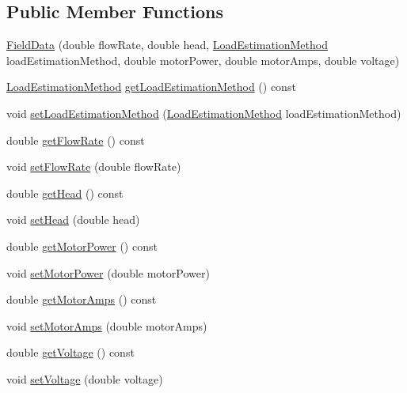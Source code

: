 \subsection*{Public Member Functions}
\begin{DoxyCompactItemize}
\item 
\hyperlink{class_field_data_a33158a88d05e657bd2c8007bae875454}{Field\+Data} (double flow\+Rate, double head, \hyperlink{class_field_data_a424e89914ba5684c01bb269dbe3312fd}{Load\+Estimation\+Method} load\+Estimation\+Method, double motor\+Power, double motor\+Amps, double voltage)
\item 
\hyperlink{class_field_data_a424e89914ba5684c01bb269dbe3312fd}{Load\+Estimation\+Method} \hyperlink{class_field_data_ae213fa76dd005d7fd251ef26beecd311}{get\+Load\+Estimation\+Method} () const
\item 
void \hyperlink{class_field_data_a7d1103b1832956d96146cbe26fb34a6d}{set\+Load\+Estimation\+Method} (\hyperlink{class_field_data_a424e89914ba5684c01bb269dbe3312fd}{Load\+Estimation\+Method} load\+Estimation\+Method)
\item 
double \hyperlink{class_field_data_a59b3261a5162b002d7b73a2d35561bd0}{get\+Flow\+Rate} () const
\item 
void \hyperlink{class_field_data_ad25c3e5a76b4e493e82d3f70cc3c0ed9}{set\+Flow\+Rate} (double flow\+Rate)
\item 
double \hyperlink{class_field_data_ac3e8e0b2de226c858b6c92cdb454bd0d}{get\+Head} () const
\item 
void \hyperlink{class_field_data_ac72a4f958930000bab0e2b772ee26711}{set\+Head} (double head)
\item 
double \hyperlink{class_field_data_a3e8e1bf84bbd00b9b52b803147968c81}{get\+Motor\+Power} () const
\item 
void \hyperlink{class_field_data_a078e6b4899e7046008ccc9de59bd0272}{set\+Motor\+Power} (double motor\+Power)
\item 
double \hyperlink{class_field_data_ad2b4fffb00fa7cfa6f69487e1034989a}{get\+Motor\+Amps} () const
\item 
void \hyperlink{class_field_data_a4f9373e8a215853b08bbe6a1915fb1a9}{set\+Motor\+Amps} (double motor\+Amps)
\item 
double \hyperlink{class_field_data_a1e8a55965e6cbd8c7b49c0dd5fbee002}{get\+Voltage} () const
\item 
void \hyperlink{class_field_data_a02735cc6956a3fce97bab645ef15dabc}{set\+Voltage} (double voltage)
\end{DoxyCompactItemize}


